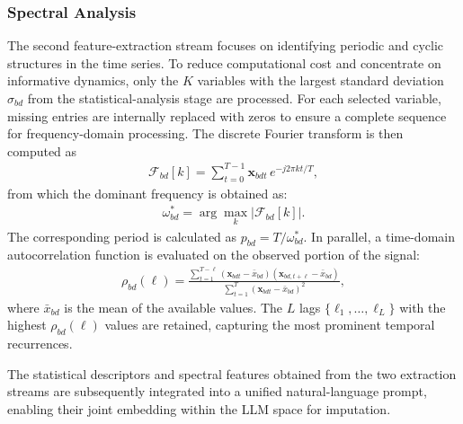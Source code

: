 \documentclass[conference]{IEEEtran}
\begin{document}
\subsubsection{Spectral Analysis}
\label{subsubsec:spectral-analysis}
The second feature-extraction stream focuses on identifying periodic and cyclic structures in the time series.
To reduce computational cost and concentrate on informative dynamics, only the $K$ variables with the largest standard deviation $\sigma_{bd}$ from the statistical-analysis stage are processed.
For each selected variable, missing entries are internally replaced with zeros to ensure a complete sequence for frequency-domain processing.
The discrete Fourier transform is then computed as
\begin{align}
\mathcal{F}_{bd}[k] = \sum_{t=0}^{T-1} \mathbf{x}_{bdt} \, e^{-j 2\pi kt / T},
\label{eq:fft}
\end{align}
from which the dominant frequency is obtained as:
\begin{align}
\omega_{bd}^* = \arg\max_{k} \big| \mathcal{F}_{bd}[k] \big|.
\label{eq:frequency}
\end{align}
The corresponding period is calculated as $p_{bd} = T / \omega_{bd}^*$.
In parallel, a time-domain autocorrelation function is evaluated on the observed portion of the signal:
\begin{align}
\rho_{bd}(\ell) = \frac{\sum_{t=1}^{T-\ell} (\mathbf{x}_{bdt} - \bar{x}_{bd}) (\mathbf{x}_{bd,t+\ell} - \bar{x}_{bd})}{\sum_{t=1}^T (\mathbf{x}_{bdt} - \bar{x}_{bd})^2},
\label{eq:lags}
\end{align}
where $\bar{x}_{bd}$ is the mean of the available values.
The $L$ lags $\{\ell_1, \ldots, \ell_L\}$ with the highest $\rho_{bd}(\ell)$ values are retained, capturing the most prominent temporal recurrences.

The statistical descriptors and spectral features obtained from the two extraction streams are subsequently integrated into a unified natural-language prompt, enabling their joint embedding within the LLM space for imputation.
\end{document}
